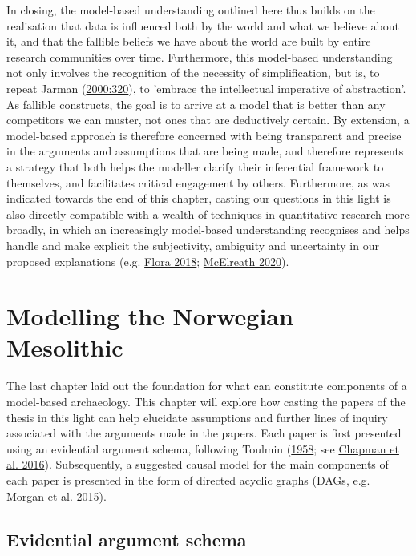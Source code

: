 \documentclass[
  a4paper,
  oneside]{uiophdthesis}
\begin{document}
In closing, the model-based understanding outlined here thus builds on the realisation that data is influenced both by the world and what we believe about it, and that the fallible beliefs we have about the world are built by entire research communities over time. Furthermore, this model-based understanding not only involves the recognition of the necessity of simplification, but is, to repeat Jarman (\protect\hyperlink{ref-jarman2000}{2000:320}), to 'embrace the intellectual imperative of abstraction'. As fallible constructs, the goal is to arrive at a model that is better than any competitors we can muster, not ones that are deductively certain. By extension, a model-based approach is therefore concerned with being transparent and precise in the arguments and assumptions that are being made, and therefore represents a strategy that both helps the modeller clarify their inferential framework to themselves, and facilitates critical engagement by others. Furthermore, as was indicated towards the end of this chapter, casting our questions in this light is also directly compatible with a wealth of techniques in quantitative research more broadly, in which an increasingly model-based understanding recognises and helps handle and make explicit the subjectivity, ambiguity and uncertainty in our proposed explanations (e.g. \protect\hyperlink{ref-flora2018}{Flora 2018}; \protect\hyperlink{ref-mcelreath2020}{McElreath 2020}).

\hypertarget{modelling-the-norwegian-mesolithic}{%
\section{Modelling the Norwegian Mesolithic}\label{modelling-the-norwegian-mesolithic}}

The last chapter laid out the foundation for what can constitute components of a model-based archaeology. This chapter will explore how casting the papers of the thesis in this light can help elucidate assumptions and further lines of inquiry associated with the arguments made in the papers. Each paper is first presented using an evidential argument schema, following Toulmin (\protect\hyperlink{ref-toulmin1958}{1958}; see \protect\hyperlink{ref-chapman2016}{Chapman et al. 2016}). Subsequently, a suggested causal model for the main components of each paper is presented in the form of directed acyclic graphs (DAGs, e.g. \protect\hyperlink{ref-morgan2015}{Morgan et al. 2015}).

\hypertarget{evidential-argument-schema}{%
\subsection{Evidential argument schema}\label{evidential-argument-schema}}
\end{document}
